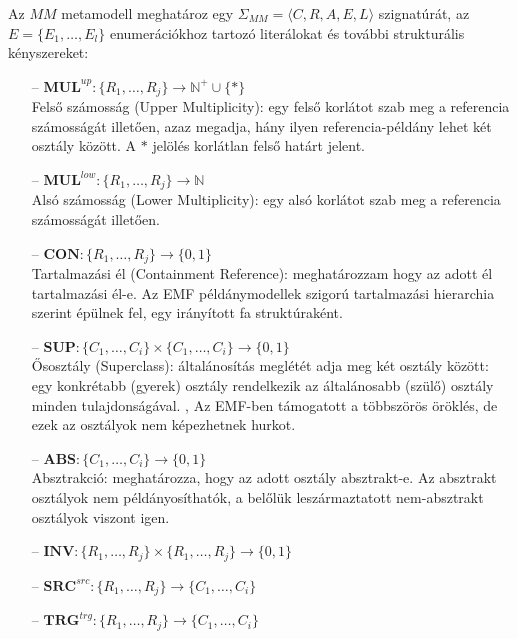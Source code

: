 \begin{definition}[Metamodell]
Az $MM$ metamodell meghatároz egy $\Sigma_{MM} = \langle\mathit{C}, \mathit{R}, \mathit{A}, \mathit{E}, \mathit{L}\rangle$ szignatúrát, az $E = \{E_1, \ldots, E_l\}$ enumerációkhoz tartozó literálokat és további strukturális kényszereket:

\begin{itemize}
  \item[--] $ \mathit{\textbf{MUL}}^\mathit{up}:  \{R_1, \ldots, R_j \} \rightarrow \mathbb{N}^+ \cup  \{*\} $ \\
  	Felső számosság (Upper Multiplicity): egy felső korlátot szab meg a referencia számosságát illetően, azaz megadja, hány ilyen referencia-példány lehet két osztály között.
  	A $ * $ jelölés korlátlan felső határt jelent.

  
  \item[--] $ \mathit{\textbf{MUL}}^\mathit{low}:  \{R_1, \ldots, R_j \} \rightarrow \mathbb{N} $ \\
  Alsó számosság (Lower Multiplicity): egy alsó korlátot szab meg a referencia számosságát illetően.
  
  \item[--] $ \mathit{\textbf{CON}}: \{R_1, \ldots, R_j \} \rightarrow \{0, 1\} $ \\
  	Tartalmazási él (Containment Reference): meghatározzam hogy az adott él tartalmazási él-e.
  	Az EMF példánymodellek szigorú tartalmazási hierarchia szerint épülnek fel, egy irányított fa struktúraként.
	
  \item[--] $ \mathit{\textbf{SUP}}: \{C_1, \ldots, C_i\} \times \{C_1, \ldots, C_i\} \rightarrow \{0, 1\} $ \\
	Ősosztály (Superclass): általánosítás meglétét adja meg két osztály között: egy konkrétabb (gyerek) osztály rendelkezik az általánosabb (szülő) osztály minden tulajdonságával.
	,
	Az EMF-ben támogatott a többszörös öröklés, de ezek az osztályok nem képezhetnek hurkot.
  \item[--] $ \mathit{\textbf{ABS}}: \{C_1, \ldots, C_i \} \rightarrow \{0, 1\} $ \\
	Absztrakció: meghatározza, hogy az adott osztály absztrakt-e. Az absztrakt osztályok nem példányosíthatók, a belőlük leszármaztatott nem-absztrakt osztályok viszont igen.

  \item[--] $ \mathit{\textbf{INV}}: \{R_1, \ldots, R_j \} \times \{R_1, \ldots, R_j\} \rightarrow \{0, 1\} $
  \item[--] $ \mathit{\textbf{SRC}}^\mathit{src}: \{R_1, \ldots, R_j \} \rightarrow \{C_1, \ldots, C_i\} $  
  \item[--] $ \mathit{\textbf{TRG}}^\mathit{trg}: \{R_1, \ldots, R_j \} \rightarrow \{C_1, \ldots, C_i\} $


 
\end{itemize}

\end{definition}

